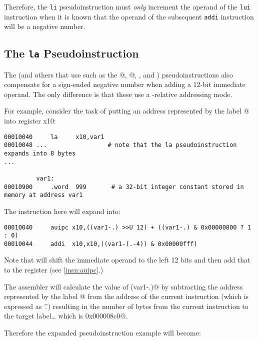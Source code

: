 Therefore, the {\tt li} pseudoinstruction must {\em only} increment the operand of the
{\tt lui} instruction when it is known that the operand of the subsequent {\tt addi} 
instruction will be a negative number.









\subsection{The {\tt la} Pseudoinstruction}

The \verb@la@ (and others that use \verb@auipc@ such as 
the @, @, \verb@call@, and \verb@tail@) pseudoinstructions
also compensate for a sign-ended negative number when adding a 12-bit immediate
operand. The only difference is that these use a \verb@pc@-relative addressing mode.

For example, consider the task of putting an address represented by the label @
into register x10:

{\small
\begin{verbatim}
00010040     la     x10,var1
00010048 ...                 # note that the la pseudoinstruction expands into 8 bytes
...

         var1:
00010900     .word  999       # a 32-bit integer constant stored in memory at address var1
\end{verbatim}
}
The \verb@la@ instruction here will expand into:
{\small
\begin{verbatim}
00010040     auipc x10,((var1-.) >>U 12) + ((var1-.) & 0x00000800 ? 1 : 0)
00010044     addi  x10,x10,((var1-(.-4)) & 0x00000fff)
\end{verbatim}
}

Note that \verb@auipc@ will shift the immediate operand to the left 12 bits and then
add that to the \verb@pc@ register (see \autoref{insn:auipc}.)

The assembler will calculate the value of \verb@(var1-.)@ by subtracting the address
represented by the label @ from the address of the current instruction 
(which is expressed as '.') resulting in the number of bytes from the current instruction
to the target label\ldots{} which is \verb@0x000008c0@.

Therefore the expanded pseudoinstruction example will become:
 
